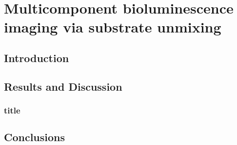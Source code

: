 \chapter{Multicomponent bioluminescence imaging via substrate unmixing}
\section{Introduction}
\section{Results and Discussion}
\subsection*{title}
\section{Conclusions}




